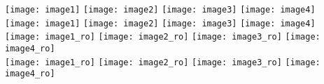 \documentclass{article}
\begin{document}
  \texttt{[image: image1]}
  \texttt{[image: image2]}
  \texttt{[image: image3]}
  \texttt{[image: image4]}\\
 \texttt{[image: image1]}
 \texttt{[image: image2]}
 \texttt{[image: image3]}
 \texttt{[image: image4]}\\

  \texttt{[image: image1\_ro]}
  \texttt{[image: image2\_ro]}
  \texttt{[image: image3\_ro]}
  \texttt{[image: image4\_ro]}\\
 \texttt{[image: image1\_ro]}
 \texttt{[image: image2\_ro]}
 \texttt{[image: image3\_ro]}
 \texttt{[image: image4\_ro]}\\
\end{document}
